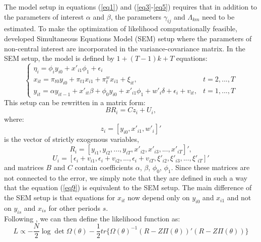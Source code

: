 \documentclass[a4paper]{article}
\begin{document}
\indent The model setup in equations (\ref{eq1}) and (\ref{eq3}-\ref{eq5}) requires that in addition to the parameters of interest $\alpha$ and $\beta$, the parameters $\gamma_{ij}$ and $\Lambda_{km}$ need to be estimated.
To make the optimization of likelihood computationally feasible, \citet{Moral+2013} developed Simultaneous Equations Model (SEM) setup where the parameters of non-central interest are incorporated in the variance-covariance matrix.
In the SEM setup, the model is defined by $1 + (T - 1)k + T$ equations:
\[
\begin{cases}
    \eta_i = \phi_i y_{i0} + x'_{i1} \phi_1 + \epsilon_i &  \\
    x_{it} = \pi_{t0} y_{i0} + \pi_{t1} x_{i1} + \pi^w_t x_{i1} + \xi_{it}, & t = 2, ..., T \\
    y_{it} = \alpha y_{it-1} + x'_{it} \beta + \phi_0 y_{i0} + x'_{i1} \phi_1 + w'_i \delta + \epsilon_i + v_{it}, & t = 1, ..., T
\end{cases}
\]
This setup can be rewritten in a matrix form:
\begin{equation}\label{eq9}
    B R_i = C z_i + U_i,
\end{equation}
\noindent where:
\begin{equation}\label{eq10}
    z_i = [y_{i0}, x'_{i1}, w'_i]'
\end{equation}
is the vector of strictly exogenous variables,
\begin{equation}\label{eq11}
    R_i = [y_{i1}, y_{i2}, ..., y_{iT}, x'_{i2}, x'_{i3}, ..., x'_{iT}]',
\end{equation}
\begin{equation}\label{eq12}
    U_i = [\epsilon_i + v_{i1}, \epsilon_i + v_{i2}, ..., \epsilon_i + v_{iT}, \xi'_{i2}, \xi'_{i3}, ..., \xi'_{iT}]'
\end{equation}
\noindent and matrices $B$ and $C$ contain coefficients $\alpha$, $\beta$, $\phi_0$, $\phi_1$.
Since these matrices are not connected to the error, we simply note that they are defined in such a way that the equation (\ref{eq9}) is equivalent to the SEM setup.
The main difference of the SEM setup is that equations for $x_{it}$ now depend only on $y_{i0}$ and $x_{i1}$ and not on $y_{is}$ and $x_{is}$ for other periods $s$.\\
\indent Following \citet{Moral+2013}, we can then define the likelihood function as:
\begin{equation}\label{eq13}
    L \propto - \frac{N}{2} \log \det \Omega(\theta) - \frac{1}{2} tr \{ \Omega(\theta)^{-1} (R - Z \Pi(\theta))' (R - Z \Pi(\theta)) \}
\end{equation}
\end{document}

